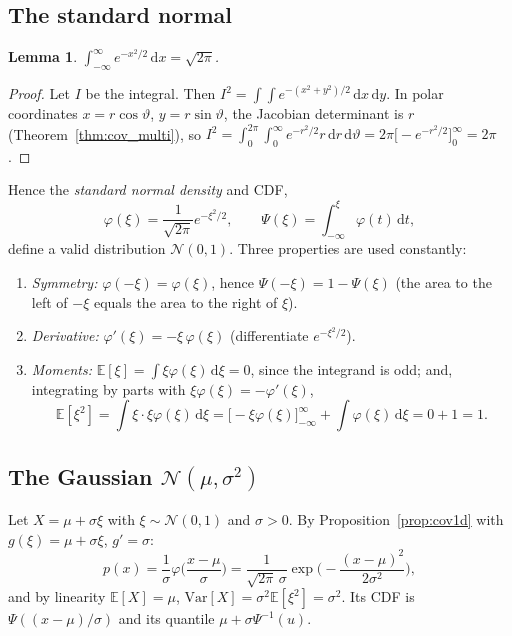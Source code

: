 \documentclass[11pt,a4paper]{article}
\numberwithin{equation}{section}
\theoremstyle{plain}
\newtheorem{lemma}[proposition]{Lemma}
\theoremstyle{definition}
\theoremstyle{remark}
\newcommand{\E}{\mathbb{E}}
\newcommand{\Var}{\mathrm{Var}}
\newcommand{\N}{\mathcal{N}}
\newcommand{\dd}{\,\mathrm{d}}
\begin{document}
\subsection{The standard normal}
\begin{lemma}
\label{lem:gauss_integral}
$\displaystyle\int_{-\infty}^{\infty}e^{-x^2/2}\dd x=\sqrt{2\pi}$.
\end{lemma}
\begin{proof}
Let $I$ be the integral. Then $I^2=\int\!\!\int e^{-(x^2+y^2)/2}\dd x\dd y$. In polar coordinates $x=r\cos\vartheta$, $y=r\sin\vartheta$, the Jacobian determinant is $r$ (Theorem~\ref{thm:cov_multi}), so $I^2=\int_0^{2\pi}\!\!\int_0^\infty e^{-r^2/2}r\dd r\dd\vartheta=2\pi\big[-e^{-r^2/2}\big]_0^\infty=2\pi$.
\end{proof}
Hence the \emph{standard normal density} and CDF,
\begin{equation}
\varphi(\xi)=\frac{1}{\sqrt{2\pi}}e^{-\xi^2/2},\qquad\Psi(\xi)=\int_{-\infty}^{\xi}\varphi(t)\dd t,
\end{equation}
define a valid distribution $\N(0,1)$. Three properties are used constantly:
\begin{enumerate}
\item \emph{Symmetry:} $\varphi(-\xi)=\varphi(\xi)$, hence $\Psi(-\xi)=1-\Psi(\xi)$ (the area to the left of $-\xi$ equals the area to the right of $\xi$).
\item \emph{Derivative:} $\varphi'(\xi)=-\xi\,\varphi(\xi)$ (differentiate $e^{-\xi^2/2}$).
\item \emph{Moments:} $\E[\xi]=\int\xi\varphi(\xi)\dd\xi=0$, since the integrand is odd; and, integrating by parts with $\xi\varphi(\xi)=-\varphi'(\xi)$,
\begin{equation*}
\E[\xi^2]=\int\xi\cdot\xi\varphi(\xi)\dd\xi=\big[-\xi\varphi(\xi)\big]_{-\infty}^{\infty}+\int\varphi(\xi)\dd\xi=0+1=1.
\end{equation*}
\end{enumerate}

\subsection{The Gaussian $\N(\mu,\sigma^2)$}
Let $X=\mu+\sigma\xi$ with $\xi\sim\N(0,1)$ and $\sigma>0$. By Proposition~\ref{prop:cov1d} with $g(\xi)=\mu+\sigma\xi$, $g'=\sigma$:
\begin{equation}
p(x)=\frac1\sigma\varphi\Big(\frac{x-\mu}\sigma\Big)=\frac{1}{\sqrt{2\pi}\,\sigma}\exp\Big(-\frac{(x-\mu)^2}{2\sigma^2}\Big),
\label{eq:gauss_pdf}
\end{equation}
and by linearity $\E[X]=\mu$, $\Var[X]=\sigma^2\E[\xi^2]=\sigma^2$. Its CDF is $\Psi((x-\mu)/\sigma)$ and its quantile $\mu+\sigma\Psi^{-1}(u)$.
\end{document}
